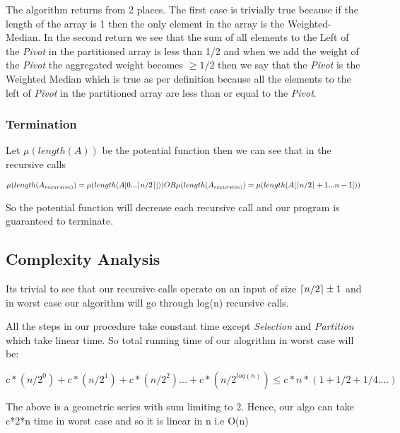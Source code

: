 \documentclass[8pt]{article}
\DeclarePairedDelimiter\ceil{\lceil}{\rceil}
\begin{document}
\begin{flushleft}
The algorithm returns from 2 places. The first case is trivially true because if the length
of the array is 1 then the only element in the array is the Weighted-Median. In the second
return we see that the sum of all elements to the Left of the \textit{Pivot} in the partitioned
array is less than 1/2 and when we add the weight of the \textit{Pivot} the aggregated weight
becomes $\geq{1/2}$ then we say that the \textit{Pivot} is the Weighted Median which is true
as per definition because all the elements to the left of \textit{Pivot} in the partitioned
array are less than or equal to the \textit{Pivot}.

\subsubsection{Termination}
Let $\mu(length(A))$ be the potential function then we can see that in the recursive calls

\begin{center}
$\mu(length(A_{recursive)}) = \mu(length(A[0...\ceil{n/2}])) OR \mu(length(A_{recursive)}) = \mu(length(A[\ceil{n/2} + 1 ... n - 1]))$
\end{center}

So the potential function will decrease each recursive call and our program is guaranteed to terminate.

\subsection{Complexity Analysis}
Its trivial to see that our recursive calls operate on an input of size $\ceil{n/2} \pm 1$ and in 
worst case our algorithm will go through log(n) recursive calls.

All the steps in our procedure take constant time except \textit{Selection} and \textit{Partition}
which take linear time. So total running time of our alogrithm in worst case will be:
\begin{center}
$c*(n/2^0) + c*(n/2^1) + c*(n/2^2) ... + c*(n/2^{log(n)}) \le c*n*(1 + 1/2 + 1/4 ....)$
\end{center}
The above is a geometric series with sum limiting to 2. Hence, our algo can take c*2*n time in
worst case and so it is linear in n i.e O(n)
\end{flushleft}
\end{document}
